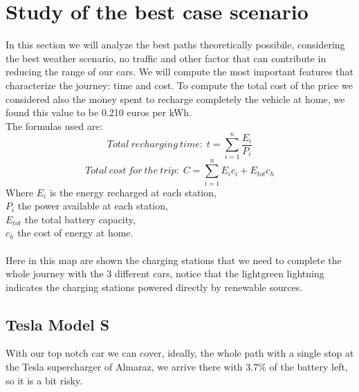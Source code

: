\documentclass{article}
\begin{document}
\section{Study of the best case scenario}
In this section we will analyze the best paths theoretically possibile, considering the best weather scenario, no traffic and other factor that can contribute in reducing the range of our cars. We will compute the most important features that characterize the journey: time and cost. To compute the total cost of the price we considered also the money spent to recharge completely the vehicle at home, we found this value to be 0.210 euros per kWh.  \cite{petrolprice}\\
The formulas used are:
\begin{equation}
Total\:recharging\:time:\; t=\sum_{i=1}^{n}\frac{E_{i}}{P_{i}} 
\end{equation}
\begin{equation}
Total\:cost\:for\:the\:trip:\; C=\sum_{i=1}^{n}E_{i}c_{i} + E_{tot}c_{h}
\end{equation}
{\centering
Where $E_{i}$ is the energy recharged at each station,\\
$P_{i}$ the power available at each station,\\
$E_{tot}$ the total battery capacity,\\
$c_{h}$ the cost of energy at home.\\}
~\\
Here in this map are shown the charging stations that we need to complete the whole journey with the 3 different cars, notice that the lightgreen lightning indicates the charging stations powered directly by renewable sources.\\

\begin{figure}[H]
\end{figure}
{}
\color{black}
\subsection{Tesla Model S}
With our top notch car we can cover, ideally, the whole path with a single stop at the Tesla supercharger of Almaraz, we arrive there with 3.7\% of the battery left, so it is a bit risky.
\\
\end{document}
